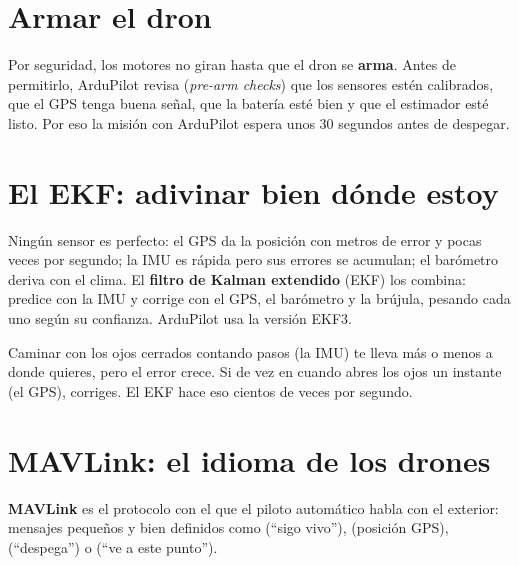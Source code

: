 \section{Armar el dron}

Por seguridad, los motores no giran hasta que el dron se \textbf{arma}. Antes de permitirlo, ArduPilot
revisa (\emph{pre-arm checks}) que los sensores estén calibrados, que el GPS tenga buena señal, que la
batería esté bien y que el estimador esté listo. Por eso la misión con ArduPilot espera unos 30
segundos antes de despegar.

\section{El EKF: adivinar bien dónde estoy}

Ningún sensor es perfecto: el GPS da la posición con metros de error y pocas veces por segundo; la IMU
es rápida pero sus errores se acumulan; el barómetro deriva con el clima. El \textbf{filtro de Kalman
extendido} (EKF) los combina: predice con la IMU y corrige con el GPS, el barómetro y la brújula,
pesando cada uno según su confianza. ArduPilot usa la versión EKF3.

\begin{ejemplo}
Caminar con los ojos cerrados contando pasos (la IMU) te lleva más o menos a donde quieres, pero el
error crece. Si de vez en cuando abres los ojos un instante (el GPS), corriges. El EKF hace eso
cientos de veces por segundo.
\end{ejemplo}

\section{MAVLink: el idioma de los drones}

\textbf{MAVLink} es el protocolo con el que el piloto automático habla con el exterior: mensajes
pequeños y bien definidos como  (``sigo vivo''),  (posición
GPS),  (``despega'') o  (``ve a este punto'').

